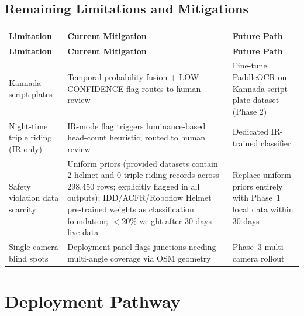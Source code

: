 \documentclass[11pt,a4paper]{article}
\begin{document}
\subsection*{Remaining Limitations and Mitigations}

\begin{longtable}{L{3.5cm} L{5.5cm} L{5.5cm}}
    \toprule
    \color{white}\textbf{Limitation} & \color{white}\textbf{Current Mitigation} & \color{white}\textbf{Future Path} \\
    \midrule
    \endfirsthead
    \toprule
    \color{white}\textbf{Limitation} & \color{white}\textbf{Current Mitigation} & \color{white}\textbf{Future Path} \\
    \midrule
    \endhead
    \bottomrule
    \endfoot

    Kannada-script plates & Temporal probability fusion + LOW CONFIDENCE flag routes to human review & Fine-tune PaddleOCR on Kannada-script plate dataset (Phase 2) \\
    Night-time triple riding (IR-only) & IR-mode flag triggers luminance-based head-count heuristic; routed to human review & Dedicated IR-trained classifier \\
    Safety violation data scarcity & Uniform priors (provided datasets contain 2 helmet and 0 triple-riding records across 298,450 rows; explicitly flagged in all outputs); IDD/ACFR/Roboflow Helmet pre-trained weights as classification foundation; $<$20\% weight after 30 days live data & Replace uniform priors entirely with Phase~1 local data within 30 days \\
    Single-camera blind spots & Deployment panel flags junctions needing multi-angle coverage via OSM geometry & Phase~3 multi-camera rollout \\
\end{longtable}

\section{Deployment Pathway}
\end{document}
